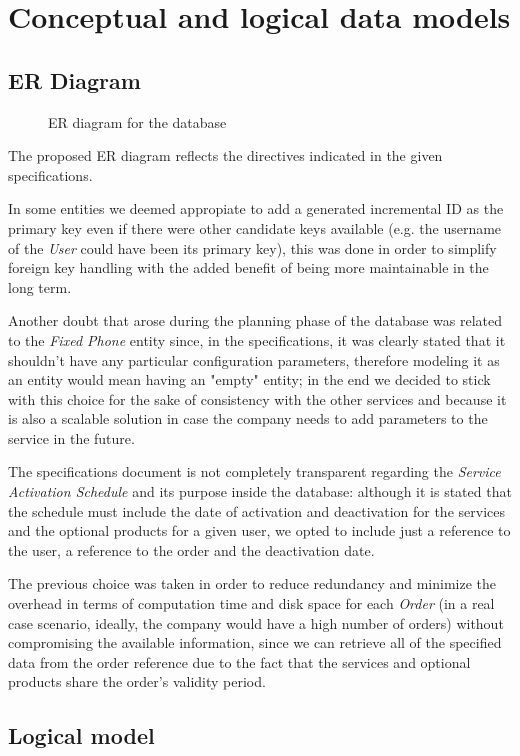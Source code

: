 
\chapter{Conceptual and logical data models}

\section{ER Diagram}

\begin{figure}[h]
    \centering
    \centerline{}
    \caption{ER diagram for the database}
    \label{fig:er_diagram}
\end{figure}

The proposed ER diagram reflects the directives indicated in the given specifications.

In some entities we deemed appropiate to add a generated incremental ID as the primary key even if there were other candidate keys available (e.g. the username of the \textit{User} could have been its primary key), this was done in order to simplify foreign key handling with the added benefit of being more maintainable in the long term.

Another doubt that arose during the planning phase of the database was related to the \textit{Fixed Phone} entity since, in the specifications, it was clearly stated that it shouldn't have any particular configuration parameters, therefore modeling it as an entity would mean having an "empty" entity; in the end we decided to stick with this choice for the sake of consistency with the other services and because it is also a scalable solution in case the company needs to add parameters to the service in the future.

The specifications document is not completely transparent regarding the \textit{Service Activation Schedule} and its purpose inside the database: although it is stated that the schedule must include the date of activation and deactivation for the services and the optional products for a given user, we opted to include just a reference to the user, a reference to the order and the deactivation date.

The previous choice was taken in order to reduce redundancy and minimize the overhead in terms of computation time and disk space for each \textit{Order} (in a real case scenario, ideally, the company would have a high number of orders) without compromising the available information, since we can retrieve all of the specified data from the order reference due to the fact that the services and optional products share the order's validity period.

\section{Logical model}
\blindtext
{}
